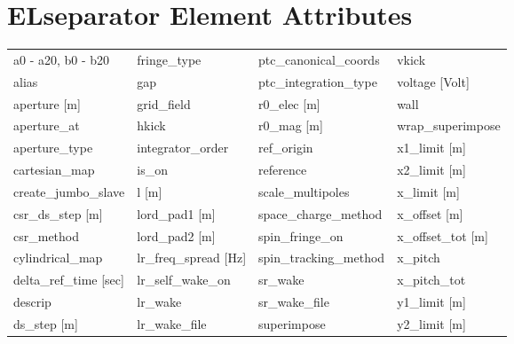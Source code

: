  \section{ELseparator Element Attributes}
 \label{s:list.elseparator}
 
 \begin{tabular}{llll} \toprule
a0 - a20, b0 - b20               & fringe_type                      & ptc_canonical_coords             & vkick                            \\
alias                            & gap                              & ptc_integration_type             & voltage [Volt]                   \\
aperture [m]                     & grid_field                       & r0_elec [m]                      & wall                             \\
aperture_at                      & hkick                            & r0_mag [m]                       & wrap_superimpose                 \\
aperture_type                    & integrator_order                 & ref_origin                       & x1_limit [m]                     \\
cartesian_map                    & is_on                            & reference                        & x2_limit [m]                     \\
create_jumbo_slave               & l [m]                            & scale_multipoles                 & x_limit [m]                      \\
csr_ds_step [m]                  & lord_pad1 [m]                    & space_charge_method              & x_offset [m]                     \\
csr_method                       & lord_pad2 [m]                    & spin_fringe_on                   & x_offset_tot [m]                 \\
cylindrical_map                  & lr_freq_spread [Hz]              & spin_tracking_method             & x_pitch                          \\
delta_ref_time [sec]             & lr_self_wake_on                  & sr_wake                          & x_pitch_tot                      \\
descrip                          & lr_wake                          & sr_wake_file                     & y1_limit [m]                     \\
ds_step [m]                      & lr_wake_file                     & superimpose                      & y2_limit [m]                     \\

\end{tabular}
